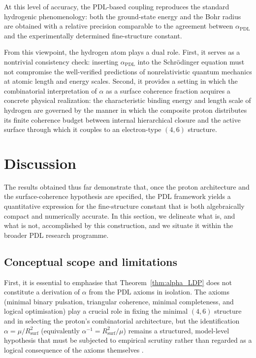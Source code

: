 \documentclass[11pt,a4paper]{article}
\theoremstyle{plain}
\theoremstyle{definition}
\theoremstyle{remark}
\begin{document}
At this level of accuracy, the PDL-based coupling reproduces the standard hydrogenic phenomenology: both the ground-state energy and the Bohr radius are obtained with a relative precision comparable to the agreement between
\(\alpha_{\mathrm{PDL}}\) and the experimentally determined fine-structure constant.

From this viewpoint, the hydrogen atom plays a dual role. First, it serves as a nontrivial consistency check: inserting \(\alpha_{\mathrm{PDL}}\) into the Schrödinger equation must not compromise the well-verified predictions of nonrelativistic quantum mechanics at atomic length and energy scales. Second, it provides a setting in which the combinatorial interpretation of \(\alpha\) as a surface coherence fraction acquires a concrete physical realization: the characteristic binding energy and length scale of hydrogen are governed by the manner in which the composite proton distributes its finite coherence budget between internal hierarchical closure and the active surface through which it couples to an electron-type \((4,6)\) structure.

\section{Discussion}

The results obtained thus far demonstrate that, once the proton architecture and the surface-coherence hypothesis are specified, the PDL framework yields a quantitative expression for the fine-structure constant that is both algebraically compact and numerically accurate. In this section, we delineate what is, and what is not, accomplished by this construction, and we situate it within the broader PDL research programme.

\subsection{Conceptual scope and limitations}

First, it is essential to emphasise that Theorem~\ref{thm:alpha_LDP} does not constitute a derivation of \(\alpha\) from the PDL axioms in isolation. The axioms (minimal binary pulsation, triangular coherence, minimal completeness, and logical optimisation) play a crucial role in fixing the minimal \((4,6)\) structure and in selecting the proton’s combinatorial architecture, but the identification \(\alpha = \mu / R_{\mathrm{surf}}^2\) (equivalently \(\alpha^{-1} = R_{\mathrm{surf}}^2 / \mu\)) remains a structured, model-level hypothesis that must be subjected to empirical scrutiny rather than regarded as a logical consequence of the axioms themselves \cite{Laubscher2026IntroPDL,Laubscher2026PDL_English,Laubscher2026LDP_French}.
\end{document}
